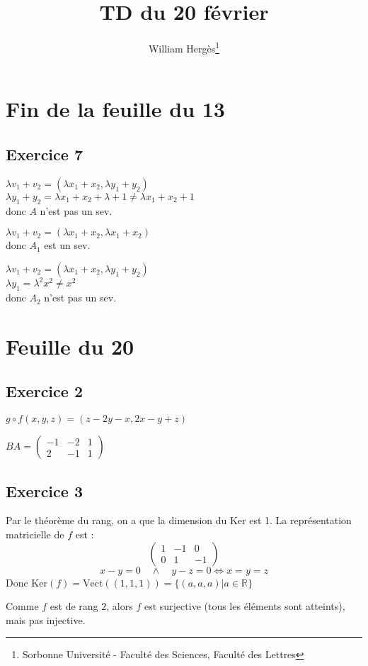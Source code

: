\documentclass[a4paper, titlepage]{article}
\title{TD du 20 février}
\author{William Hergès\thanks{Sorbonne Université - Faculté des Sciences, Faculté des Lettres}}
\begin{document}
	\maketitle
	\newpage
	\section{Fin de la feuille du 13}
	\subsection*{Exercice 7}
	$\lambda v_1+v_2 = (\lambda x_1+x_2,\lambda y_1 + y_2)$\\
	$\lambda y_1+y_2=\lambda x_1+x_2+\lambda+1 \neq \lambda x_1+x_2+1$\\
	donc $A$ n'est pas un sev.

	$\lambda v_1+v_2 = (\lambda x_1 + x_2, \lambda x_1 + x_2)$\\
	donc $A_1$ est un sev.

	$\lambda v_1+v_2 = (\lambda x_1+x_2,\lambda y_1 + y_2)$\\
	$\lambda y_1 = \lambda^2 x^2 \neq x^2$\\
	donc $A_2$ n'est pas un sev.
	\section{Feuille du 20}
	\subsection*{Exercice 2}
	$g\circ f (x,y,z) = (z-2y-x, 2x-y+z)$

	$BA = \begin{pmatrix} -1&-2&1\\2&-1&1 \end{pmatrix} $
	\subsection*{Exercice 3}
	Par le théorème du rang, on a que la dimension du Ker est 1. La représentation matricielle de $f$ est :
	$$ \begin{pmatrix} 1&-1&0\\0&1&-1 \end{pmatrix}  $$
	$$x-y = 0 \quad\land\quad y-z = 0 \iff x = y = z$$
	Donc $\mathrm{Ker}(f) = \mathrm{Vect}((1,1,1)) = \{(a,a,a)|a\in\mathbb{R}\}$

	Comme $f$ est de rang $2$, alors $f$ est surjective (tous les éléments sont atteints), mais pas injective.
\end{document}
